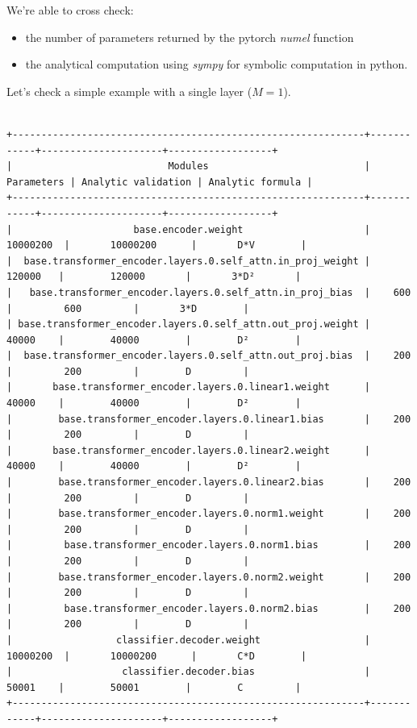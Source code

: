 \documentclass[a4paper]{article}
\begin{document}
We're able to cross check:
\begin{itemize}
    \item the number of parameters returned by the pytorch \textit{numel} function
    \item the analytical computation using \textit{sympy} for symbolic computation in python.
\end{itemize}
Let's check a simple example with a single layer ($M=1$).
\begin{tiny}
\begin{verbatim}

+-------------------------------------------------------------+------------+---------------------+------------------+
|                           Modules                           | Parameters | Analytic validation | Analytic formula |
+-------------------------------------------------------------+------------+---------------------+------------------+
|                     base.encoder.weight                     |  10000200  |       10000200      |       D*V        |
|  base.transformer_encoder.layers.0.self_attn.in_proj_weight |   120000   |        120000       |       3*D²       |
|   base.transformer_encoder.layers.0.self_attn.in_proj_bias  |    600     |         600         |       3*D        |
| base.transformer_encoder.layers.0.self_attn.out_proj.weight |   40000    |        40000        |        D²        |
|  base.transformer_encoder.layers.0.self_attn.out_proj.bias  |    200     |         200         |        D         |
|       base.transformer_encoder.layers.0.linear1.weight      |   40000    |        40000        |        D²        |
|        base.transformer_encoder.layers.0.linear1.bias       |    200     |         200         |        D         |
|       base.transformer_encoder.layers.0.linear2.weight      |   40000    |        40000        |        D²        |
|        base.transformer_encoder.layers.0.linear2.bias       |    200     |         200         |        D         |
|        base.transformer_encoder.layers.0.norm1.weight       |    200     |         200         |        D         |
|         base.transformer_encoder.layers.0.norm1.bias        |    200     |         200         |        D         |
|        base.transformer_encoder.layers.0.norm2.weight       |    200     |         200         |        D         |
|         base.transformer_encoder.layers.0.norm2.bias        |    200     |         200         |        D         |
|                  classifier.decoder.weight                  |  10000200  |       10000200      |       C*D        |
|                   classifier.decoder.bias                   |   50001    |        50001        |        C         |
+-------------------------------------------------------------+------------+---------------------+------------------+
\end{verbatim}
\end{tiny}
\end{document}
